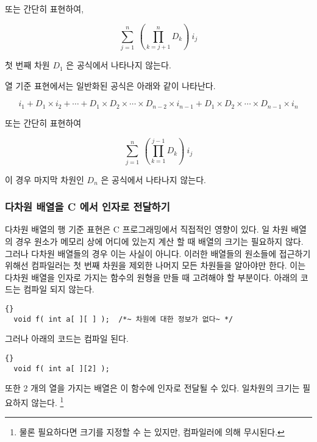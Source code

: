 또는 간단히 표현하여, 

\begin{displaymath}
\sum_{j=1}^{n} \: \left( \prod_{k=j+1}^{n} D_k \right) \: i_j
\end{displaymath}

첫 번째 차원 $D_1$ 은 공식에서 나타나지 않는다. 

열 기준 표현에서는 일반화된 공식은 아래와 같이 나타난다. 

\begin{displaymath}
i_1 + D_1 \times i_2 + \cdots + D_1 \times D_2 \times \cdots \times D_{n-2} 
\times i_{n-1} + D_1 \times D_2 \times \cdots \times D_{n-1} \times i_n
\end{displaymath}

또는 간단히 표현하여

\begin{displaymath}
\sum_{j=1}^{n} \: \left( \prod_{k=1}^{j-1} D_k \right) \: i_j
\end{displaymath}

이 경우 마지막 차원인 $D_n$ 은 공식에서 나타나지 않는다. 

\subsubsection{다차원 배열을 C 에서 인자로 전달하기}

다차원 배열의 행 기준 표현은 C 프로그래밍에서 직접적인 영향이 있다. 일 차원 배열의 경우
원소가 메모리 상에 어디에 있는지 계산 할 때 배열의 크기는 필요하지 않다. 그러나 다차원 배열들의
경우 이는 사실이 아니다. 이러한 배열들의 원소들에 접근하기 위해선 컴파일러는 첫 번째 차원을 제외한
나머지 모든 차원들을 알아야만 한다. 이는 다차원 배열을 인자로 가지는 함수의 원형을 만들 때
고려해야 할 부분이다. 아래의 코드는 컴파일 되지 않는다. 

\begin{lstlisting}[stepnumber=0,escapeinside=~~]{}
  void f( int a[ ][ ] );  /*~ 차원에 대한 정보가 없다~ */
\end{lstlisting}

그러나 아래의 코드는 컴파일 된다. 

\begin{lstlisting}[stepnumber=0]{}
  void f( int a[ ][2] );
\end{lstlisting}

또한 2 개의 열을 가지는 배열은 이 함수에 인자로 전달될 수 있다. 일차원의 크기는
필요하지 않는다. \footnote{물론 필요하다면 크기를 지정할 수 는 있지만, 컴파일러에
의해 무시된다.}

